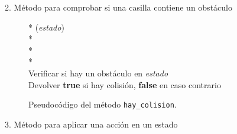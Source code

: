 \documentclass[conference,a4paper]{IEEEtran}
\begin{document}
2. Método para comprobar si una casilla contiene un obstáculo\newline

\begin{figure}[h]
  \begin{pseudo}*
    (\textit{estado}) \\*
     \\*
     \\*
     \\
    Verificar si hay un obstáculo en \textit{estado} \\
    Devolver \textbf{true} si hay colisión, \textbf{false} en caso contrario
  \end{pseudo}
  \caption{Pseudocódigo del método \texttt{hay\_colision}.}
  \label{fig:hay_colision}
\end{figure}

3. Método para aplicar una acción en un estado
\end{document}
